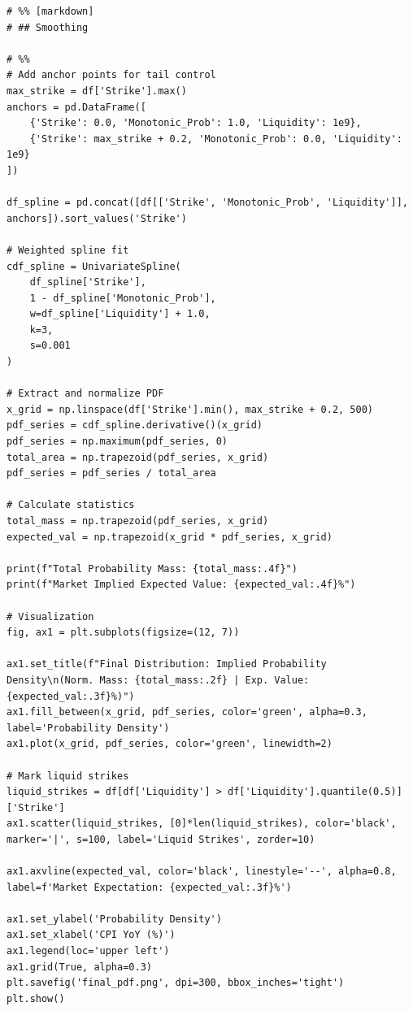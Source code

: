 \documentclass[11pt]{article}
\begin{document}
\begin{lstlisting}
# %% [markdown]
# ## Smoothing

# %%
# Add anchor points for tail control
max_strike = df['Strike'].max()
anchors = pd.DataFrame([
    {'Strike': 0.0, 'Monotonic_Prob': 1.0, 'Liquidity': 1e9},
    {'Strike': max_strike + 0.2, 'Monotonic_Prob': 0.0, 'Liquidity': 1e9} 
])

df_spline = pd.concat([df[['Strike', 'Monotonic_Prob', 'Liquidity']], anchors]).sort_values('Strike')

# Weighted spline fit
cdf_spline = UnivariateSpline(
    df_spline['Strike'], 
    1 - df_spline['Monotonic_Prob'], 
    w=df_spline['Liquidity'] + 1.0, 
    k=3, 
    s=0.001
)

# Extract and normalize PDF
x_grid = np.linspace(df['Strike'].min(), max_strike + 0.2, 500)
pdf_series = cdf_spline.derivative()(x_grid)
pdf_series = np.maximum(pdf_series, 0)
total_area = np.trapezoid(pdf_series, x_grid)
pdf_series = pdf_series / total_area

# Calculate statistics
total_mass = np.trapezoid(pdf_series, x_grid)
expected_val = np.trapezoid(x_grid * pdf_series, x_grid)

print(f"Total Probability Mass: {total_mass:.4f}")
print(f"Market Implied Expected Value: {expected_val:.4f}%")

# Visualization
fig, ax1 = plt.subplots(figsize=(12, 7))

ax1.set_title(f"Final Distribution: Implied Probability Density\n(Norm. Mass: {total_mass:.2f} | Exp. Value: {expected_val:.3f}%)")
ax1.fill_between(x_grid, pdf_series, color='green', alpha=0.3, label='Probability Density')
ax1.plot(x_grid, pdf_series, color='green', linewidth=2)

# Mark liquid strikes
liquid_strikes = df[df['Liquidity'] > df['Liquidity'].quantile(0.5)]['Strike']
ax1.scatter(liquid_strikes, [0]*len(liquid_strikes), color='black', marker='|', s=100, label='Liquid Strikes', zorder=10)

ax1.axvline(expected_val, color='black', linestyle='--', alpha=0.8, label=f'Market Expectation: {expected_val:.3f}%')

ax1.set_ylabel('Probability Density')
ax1.set_xlabel('CPI YoY (%)')
ax1.legend(loc='upper left')
ax1.grid(True, alpha=0.3)
plt.savefig('final_pdf.png', dpi=300, bbox_inches='tight')
plt.show()
\end{lstlisting}
\end{document}
